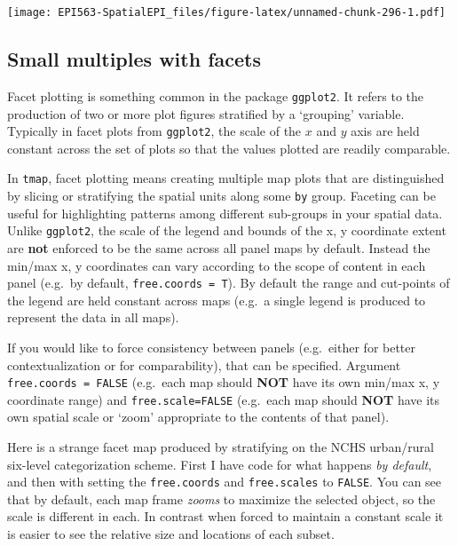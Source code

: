 \documentclass[
]{book}
\newcommand{\passthrough}[1]{#1}
\begin{document}
\texttt{[image: EPI563-SpatialEPI\_files/figure-latex/unnamed-chunk-296-1.pdf]}

\hypertarget{tmap-facet}{%
\subsection{Small multiples with facets}\label{tmap-facet}}

Facet plotting is something common in the package \passthrough{\lstinline!ggplot2!}. It refers to the production of two or more plot figures stratified by a `grouping' variable. Typically in facet plots from \passthrough{\lstinline!ggplot2!}, the scale of the \(x\) and \(y\) axis are held constant across the set of plots so that the values plotted are readily comparable.

In \passthrough{\lstinline!tmap!}, facet plotting means creating multiple map plots that are distinguished by slicing or stratifying the spatial units along some \passthrough{\lstinline!by!} group. Faceting can be useful for highlighting patterns among different sub-groups in your spatial data. Unlike \passthrough{\lstinline!ggplot2!}, the scale of the legend and bounds of the x, y coordinate extent are \textbf{not} enforced to be the same across all panel maps by default. Instead the min/max x, y coordinates can vary according to the scope of content in each panel (e.g.~by default, \passthrough{\lstinline!free.coords = T!}). By default the range and cut-points of the legend are held constant across maps (e.g.~a single legend is produced to represent the data in all maps).

If you would like to force consistency between panels (e.g.~either for better contextualization or for comparability), that can be specified. Argument \passthrough{\lstinline!free.coords = FALSE!} (e.g.~each map should \textbf{NOT} have its own min/max x, y coordinate range) and \passthrough{\lstinline!free.scale=FALSE!} (e.g.~each map should \textbf{NOT} have its own spatial scale or `zoom' appropriate to the contents of that panel).

Here is a strange facet map produced by stratifying on the NCHS urban/rural six-level categorization scheme. First I have code for what happens \emph{by default}, and then with setting the \passthrough{\lstinline!free.coords!} and \passthrough{\lstinline!free.scales!} to \passthrough{\lstinline!FALSE!}. You can see that by default, each map frame \emph{zooms} to maximize the selected object, so the scale is different in each. In contrast when forced to maintain a constant scale it is easier to see the relative size and locations of each subset.
\end{document}
